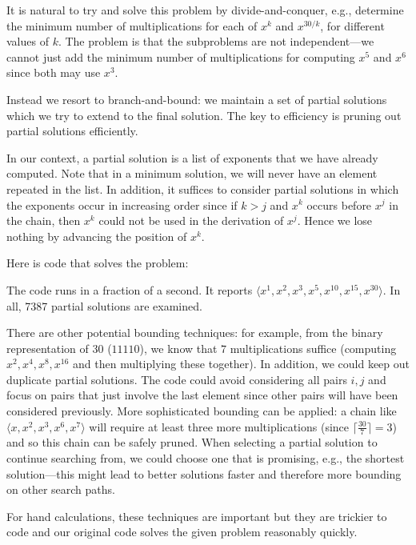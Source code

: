 It is natural to try and solve this problem by divide-and-conquer, e.g., 
determine the minimum number of multiplications for each of $x^{k}$ and $x^{30/k}$,
for different values of $k$.  The problem is that the subproblems are not
independent---we cannot just add the minimum number of multiplications for computing
$x^{5}$ and $x^{6}$ since both may use $x^{3}$.

Instead we resort to branch-and-bound: we maintain a set of partial solutions
which we try to extend to the final solution. The key to efficiency is
pruning out partial solutions efficiently.

In our context, a partial solution is a list of exponents that we have
already computed. Note that in a minimum solution, we will never have
an element repeated in the list. In addition, it suffices to consider
partial solutions in which the exponents occur in increasing order
since if $k > j$ and $x^k$ occurs before $x^j$ in the chain, then
$x^k$ could not be used in the derivation of $x^j$. Hence we lose nothing by advancing the
position of $x^k$. 

Here is code that solves the problem:



The code runs in a fraction of a second.
It reports  $\langle x^{1}, x^{2}, x^{3}, x^{5}, x^{10}, x^{15}, x^{30}\rangle$.
In all, 7387 partial solutions are examined.

There are other potential bounding techniques: for example, from the binary
representation of 30 ($11110$), we know that $7$ multiplications suffice (computing
$x^2, x^4,x^8,x^{16}$ and then multiplying these together).  
In addition, we could keep out duplicate partial solutions.
The code could avoid considering all pairs $i,j$ and focus on pairs that just involve
the last element since other pairs will have been considered previously.
More sophisticated bounding can be applied:
a chain like $\langle x, x^2, x^3,x^6,x^7\rangle$ will require at least three
more multiplications (since $\lceil \frac{30}{7}\rceil = 3$) and so this chain
can be safely pruned. 
When selecting a partial solution to continue searching from, we could
choose one that is promising, e.g., the shortest solution---this might lead to
better solutions faster and therefore more bounding on other search paths.

For hand calculations, these techniques are important but
they are trickier to code and our original code solves the
given problem reasonably quickly.


